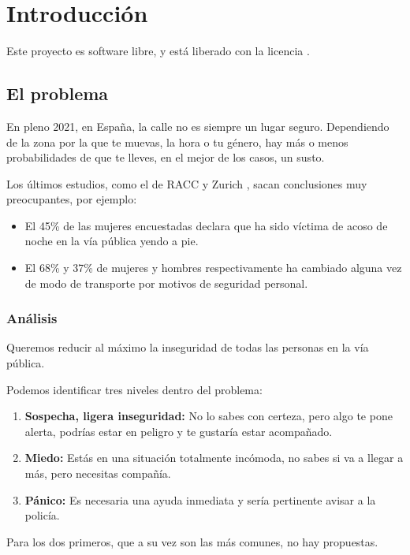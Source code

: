 \chapter{Introducción}

Este proyecto es software libre, y está liberado con la licencia \cite{gplv3}.

\section{El problema}
En pleno 2021, en España, la calle no es siempre un lugar seguro. Dependiendo de la zona por la que te muevas, la hora o tu género,
hay más o menos probabilidades de que te lleves, en el mejor de los casos, un susto.

Los últimos estudios, como el de RACC y Zurich \cite{racc-zurich}, sacan conclusiones muy preocupantes, por ejemplo: 
\begin{itemize}
  \item El 45\% de las mujeres encuestadas declara que ha sido víctima de acoso de noche en la vía pública yendo a pie.
  \item El 68\% y 37\% de mujeres y hombres respectivamente ha cambiado alguna vez de modo de transporte por motivos de seguridad personal.
\end{itemize}

\subsection{Análisis}
Queremos reducir al máximo la inseguridad de todas las personas en la vía pública.

Podemos identificar tres niveles dentro del problema:
\begin{enumerate}
  \item \textbf{Sospecha, ligera inseguridad:} No lo sabes con certeza, pero algo te pone alerta, podrías estar en peligro y te gustaría estar acompañado.
  \item \textbf{Miedo:} Estás en una situación totalmente incómoda, no sabes si va a llegar a más, pero necesitas compañía.
  \item \textbf{Pánico:} Es necesaria una ayuda inmediata y sería pertinente avisar a la policía.
\end{enumerate}

Para los dos primeros, que a su vez son las más comunes, no hay propuestas.

